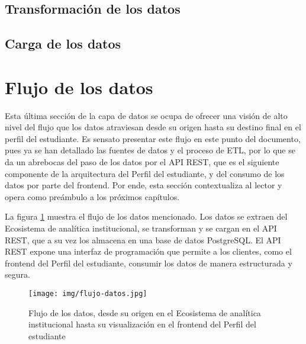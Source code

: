\subsection{Transformación de los datos}


\subsection{Carga de los datos}


\section{Flujo de los datos}

Esta última sección de la capa de datos se ocupa de ofrecer una visión de alto nivel del flujo que los datos atraviesan desde su origen hasta su destino final en el perfil del estudiante. Es sensato presentar este flujo en este punto del documento, pues ya se han detallado las fuentes de datos y el proceso de \gls{ETL}, por lo que se da un abrebocas del paso de los datos por el API REST, que es el siguiente componente de la arquitectura del Perfil del estudiante, y del consumo de los datos por parte del frontend. Por ende, esta sección contextualiza al lector y opera como preámbulo a los próximos capítulos.

La figura \ref{fig:flujo_datos} muestra el flujo de los datos mencionado. Los datos se extraen del Ecosistema de analítica institucional, se transforman y se cargan en el \gls{API REST}, que a su vez los almacena en una base de datos PostgreSQL. El \gls{API REST} expone una interfaz de programación que permite a los clientes, como el frontend del Perfil del estudiante, consumir los datos de manera estructurada y segura.

\begin{figure}[h]
	\centering
	\texttt{[image: img/flujo-datos.jpg]}
	\caption{Flujo de los datos, desde su origen en el Ecosistema de analítica institucional hasta su visualización en el frontend del Perfil del estudiante}
	\label{fig:flujo_datos}
\end{figure}
